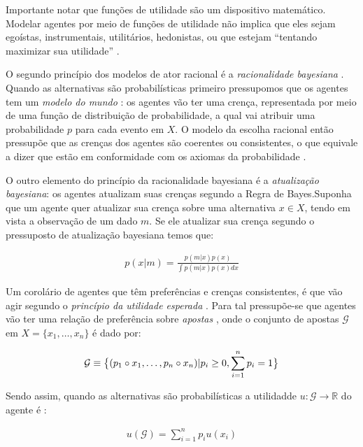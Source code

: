 Importante notar que funções de utilidade são um dispositivo matemático. Modelar
agentes por meio de funções de utilidade não implica que eles sejam egoístas,
instrumentais, utilitários, hedonistas, ou que estejam ``tentando maximizar sua
utilidade'' \cite{gaus2007philosophy}.

O segundo princípio dos modelos de ator racional é a \textit{racionalidade
  bayesiana} \cite{gintis2016individuality}. Quando as alternativas são
probabilísticas primeiro pressupomos que os agentes tem um \textit{modelo do
  mundo} \cite{acemoglu2011opinion}: os agentes vão ter uma crença, representada
por meio de uma função de distribuição de probabilidade, a qual vai atribuir uma
probabilidade \(p\) para cada evento em \(X\). O modelo da escolha racional
então pressupõe que as crenças dos agentes são coerentes ou consistentes, o que
equivale a dizer que estão em conformidade com os axiomas da probabilidade
\cite{jackman2009bayesian}.

O outro elemento do princípio da racionalidade bayesiana é a \textit{atualização
  bayesiana}\cite[p.104]{gintis2016individuality}: os agentes atualizam suas
crenças segundo a Regra de Bayes.Suponha que um agente quer atualizar sua crença
sobre uma alternativa \(x \in X\), tendo em vista a observação de um dado \(m\).
Se ele atualizar sua crença segundo o pressuposto de atualização bayesiana temos
que:

\begin{align*}
  p(x|m) =
  \frac{p(m|x)
  p(x)}
  {\int p(m|x)
  p(x)
  dx}
\end{align*}

Um corolário de agentes que têm preferências e crenças consistentes, é que vão
agir segundo o \textit{princípio da utilidade esperada}
\cite{sep-rationality-normative-utility}. Para tal pressupõe-se que agentes vão
ter uma relação de preferência sobre \textit{apostas} \cite{jehle2001advanced},
onde o conjunto de apostas \(\mathcal{G}\) em \(X = \{ x_1, \ldots, x_n \}\) é dado
por:

\begin{align*}
  \mathcal{G} \equiv \big{\{}
  (p_1 \circ x_1, \ldots, p_n \circ x_n  )
  | p_i \geq 0,
  \sum_{i = 1 }^n p_i
  = 1  \big{\}}  
\end{align*}

Sendo assim, quando as alternativas são probabilísticas a utilidadde \(u:
\mathcal{G} \to \mathbb{R} \) do agente é
\cite{jehle2001advanced,sep-rationality-normative-utility}:

\begin{align*}
  u(\mathcal{G}) = \sum_{i =1}^n p_i u(x_i)
\end{align*}

